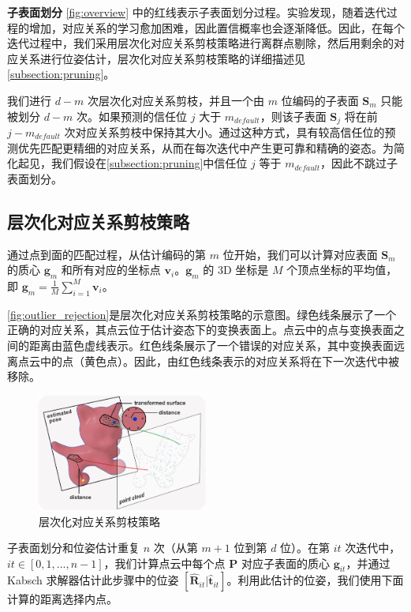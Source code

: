 \textbf{子表面划分} \autoref{fig:overview} 中的红线表示子表面划分过程。实验发现，随着迭代过程的增加，对应关系的学习愈加困难，因此置信概率也会逐渐降低。因此，在每个迭代过程中，我们采用层次化对应关系剪枝策略进行离群点剔除，然后用剩余的对应关系进行位姿估计，层次化对应关系剪枝策略的详细描述见\autoref{subsection:pruning}。

我们进行 $d - m$ 次层次化对应关系剪枝，并且一个由 $m$ 位编码的子表面 $\mathbf{S}_m$ 只能被划分 $d - m$ 次。如果预测的信任位 $j$ 大于 $m_{default}$，则该子表面 $\mathbf{S}_j$ 将在前 $j - m_{default}$ 次对应关系剪枝中保持其大小。通过这种方式，具有较高信任位的预测优先匹配更精细的对应关系，从而在每次迭代中产生更可靠和精确的姿态。为简化起见，我们假设在\autoref{subsection:pruning}中信任位 $j$ 等于 $m_{default}$，因此不跳过子表面划分。

\subsection{层次化对应关系剪枝策略}\label{subsection:pruning}

通过点到面的匹配过程，从估计编码的第 $m$ 位开始，我们可以计算对应表面 $\mathbf{S}_{m}$ 的质心 $\mathbf{g}_{m}$ 和所有对应的坐标点 $\mathbf{v}_i$。$\mathbf{g}_{m}$ 的 3D 坐标是 $M$ 个顶点坐标的平均值，即 $\mathbf{g}_m = \frac{1}{M}\sum_{i=1}^{M}\mathbf{v}_i$。


\autoref{fig:outlier_rejection}是层次化对应关系剪枝策略的示意图。绿色线条展示了一个正确的对应关系，其点云位于估计姿态下的变换表面上。点云中的点与变换表面之间的距离由蓝色虚线表示。红色线条展示了一个错误的对应关系，其中变换表面远离点云中的点（黄色点）。因此，由红色线条表示的对应关系将在下一次迭代中被移除。

\begin{figure}[htbp]
    \centering
    \includegraphics[width=0.5\textwidth]{figure/hipose/outlier_rejection.pdf}
    \caption{层次化对应关系剪枝策略}
    \label{fig:outlier_rejection}
\end{figure}

子表面划分和位姿估计重复 $n$ 次（从第 $m + 1$ 位到第 $d$ 位）。在第 $it$ 次迭代中，$it \in [0,1,...,n-1]$，我们计算点云中每个点 $\mathbf{P}$ 对应子表面的质心 $\mathbf{g}_{it}$，并通过 Kabsch 求解器估计此步骤中的位姿 $[\hat{\mathbf{R}}_{it}|\hat{\mathbf{t}}_{it}]$。利用此估计的位姿，我们使用下面计算的距离选择内点。

